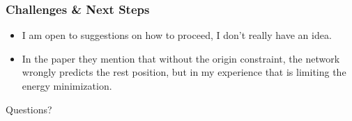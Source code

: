\documentclass{beamer}
\begin{document}




\begin{frame}
    \frametitle{Challenges \& Next Steps}
        \begin{itemize}
            \item I am open to suggestions on how to proceed, I don't really have an idea.
            \item In the paper they mention that without the origin constraint, the network wrongly predicts the rest position, but in my experience that is limiting the energy minimization.
        \end{itemize}
\end{frame}

\begin{frame}
    \begin{center}
        \color{blue} \Huge{Questions?}
    \end{center}

\end{frame}
\end{document}
